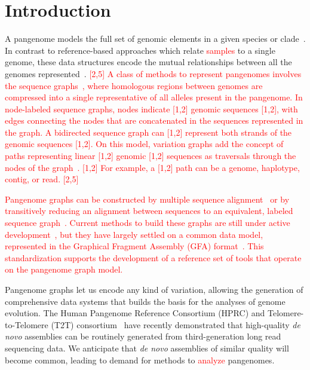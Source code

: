 \documentclass{bioinfo}
\newcommand{\REVIEWED}[1]{{\textcolor{Red}{#1}}}
\begin{document}
\section{Introduction}
A pangenome models the full set of genomic elements in a given species or clade~\REVIEWED{\citep{cpang2018,Eizenga_2020}}.
In contrast to reference-based approaches which relate \REVIEWED{samples} to a single genome, these data structures encode the mutual relationships between all the genomes represented\REVIEWED{~\citep{Ballouz2019}}.
\REVIEWED{[2,5] A class of methods to represent pangenomes involves the sequence graphs~\citep{Hein1989, Paten:2017}, where homologous regions between genomes are compressed into a single representative of all alleles present in the pangenome.
In node-labeled sequence graphs, nodes indicate \REVIEWED{[1,2] genomic sequences [1,2]}, with edges connecting the nodes that are concatenated in the sequences represented in the graph.
A bidirected sequence graph can \REVIEWED{[1,2] represent both strands of the genomic sequences [1,2]}.
On this model, variation graphs add the concept of paths representing linear \REVIEWED{[1,2] genomic [1,2]} sequences as traversals through the nodes of the graph~\citep{Garrison:2018}. \REVIEWED{[1,2] For example, a [1,2]} path can be a genome, haplotype, contig, or read. [2,5]}

\REVIEWED{Pangenome graphs can be constructed by multiple sequence alignment~\citep{Lee_2002,Grasso_2004} or by transitively reducing an alignment between sequences to an equivalent, labeled sequence graph~\citep{Kehr_2014,Garrison_2019_thesis}.
Current methods to build these graphs are still under active development~\citep{Li:2020,Armstrong:2020,pggb}, but they have largely settled on a common data model, represented in the Graphical Fragment Assembly (GFA) format~\citep{GFA}.
This standardization supports the development of a reference set of tools that operate on the pangenome graph model.}

Pangenome graphs let us encode any kind of variation, allowing the generation of comprehensive data systems that builds the basis for the analyses of genome evolution.
The Human Pangenome Reference Consortium (HPRC) and Telomere-to-Telomere (T2T) consortium~\citep{Miga:2020, Logsdon_2021, Nurk_2021} have recently demonstrated that high-quality \textit{de novo} assemblies can be routinely generated from third-generation long read sequencing data.
We anticipate that \textit{de novo} assemblies of similar quality will become common, leading to demand for methods to \REVIEWED{analyze} pangenomes.
\end{document}
